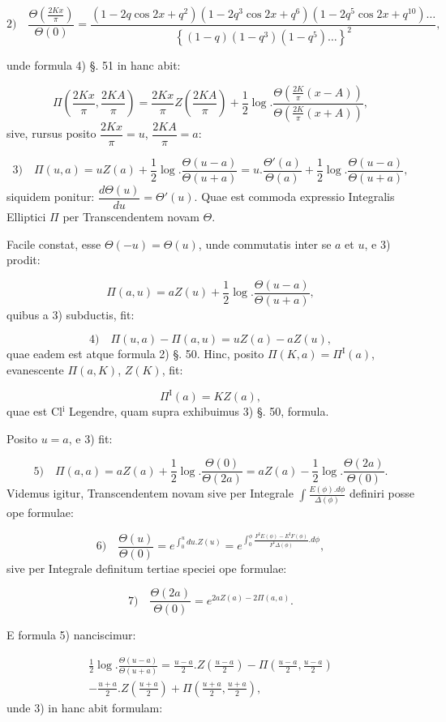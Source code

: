 \documentclass{article}
\begin{document}
\[
\text{2)}\quad \frac{\Theta\left(\frac{2Kx}{\pi}\right)}{\Theta(0)}=\frac{(1-2q\cos2x+q^{2})(1-2q^{3}\cos2x+q^{6})(1-2q^{5}\cos2x+q^{10})\ldots}{\left\{(1-q)(1-q^{3})(1-q^{5})\ldots\right\}^{2}},
\]

unde formula 4) §. 51 in hanc abit:

\[
\Pi\left(\frac{2Kx}{\pi},\frac{2KA}{\pi}\right)=\frac{2Kx}{\pi}Z\left(\frac{2KA}{\pi}\right)+\frac{1}{2}\log.\frac{\Theta\left(\frac{2K}{\pi}(x-A)\right)}{\Theta\left(\frac{2K}{\pi}(x+A)\right)},
\]
sive, rursus posito $\dfrac{2Kx}{\pi}=u$, $\dfrac{2KA}{\pi}=a$:

\[
\text{3)}\quad \Pi(u,a)=uZ(a)+\frac{1}{2}\log.\frac{\Theta(u-a)}{\Theta(u+a)}=u.\frac{\Theta'(a)}{\Theta(a)}+\frac{1}{2}\log.\frac{\Theta(u-a)}{\Theta(u+a)},
\]
siquidem ponitur: $\dfrac{d\Theta(u)}{du}=\Theta'(u)$. Quae est commoda expressio Integralis Elliptici $\Pi$ per Transcendentem novam $\Theta$.

Facile constat, esse $\Theta(-u)=\Theta(u)$, unde commutatis inter se $a$ et $u$, e 3) prodit:

\[
\Pi(a,u)=aZ(u)+\frac{1}{2}\log.\frac{\Theta(u-a)}{\Theta(u+a)},
\]
quibus a 3) subductis, fit:

\[
\text{4)}\quad \Pi(u,a)-\Pi(a,u)=uZ(a)-aZ(u),
\]
quae eadem est atque formula 2) §. 50. Hinc, posito $\Pi(K,a)=\Pi^{\mathrm{I}}(a)$, evanescente $\Pi(a,K)$, $Z(K)$, fit:

\[
\Pi^{\mathrm{I}}(a)=KZ(a),
\]
quae est Cl$^{\mathrm{i}}$ Legendre, quam supra exhibuimus 3) §. 50, formula.

Posito $u=a$, e 3) fit:

\[
\text{5)}\quad \Pi(a,a)=aZ(a)+\frac{1}{2}\log.\frac{\Theta(0)}{\Theta(2a)}=aZ(a)-\frac{1}{2}\log.\frac{\Theta(2a)}{\Theta(0)}.
\]
Videmus igitur, Transcendentem novam sive per Integrale $\displaystyle\int\frac{E(\phi).d\phi}{\Delta(\phi)}$ definiri posse ope formulae:

\[
\text{6)}\quad \frac{\Theta(u)}{\Theta(0)}=e^{\int_{0}^{u}du.Z(u)}=e^{\int_{0}^{\phi}\frac{F^{\mathrm{I}}E(\phi)-E^{\mathrm{I}}F(\phi)}{F^{\mathrm{I}}\Delta(\phi)}.d\phi},
\]
sive per Integrale definitum tertiae speciei ope formulae:

\[
\text{7)}\quad \frac{\Theta(2a)}{\Theta(0)}=e^{2aZ(a)-2\Pi(a,a)}.
\]

E formula 5) nanciscimur:

\[
\begin{gathered}
\frac{1}{2}\log.\frac{\Theta(u-a)}{\Theta(u+a)}=\frac{u-a}{2}.Z\left(\frac{u-a}{2}\right)-\Pi\left(\frac{u-a}{2},\frac{u-a}{2}\right)\\[1.5ex]
-\frac{u+a}{2}.Z\left(\frac{u+a}{2}\right)+\Pi\left(\frac{u+a}{2},\frac{u+a}{2}\right),
\end{gathered}
\]
unde 3) in hanc abit formulam:
\end{document}
